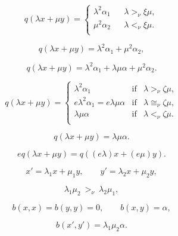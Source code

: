 \documentclass{article}
\begin{document}
\begin{equation}\label{eq:II.7.10}
   q({\lambda} x + \mu y ) = \left\{
    \begin{array}{lll}
      {\lambda}^2 {\alpha}_1 & &  {\lambda} {>_\nu} {\xi} \mu, \\[1mm]
       \mu^2 {\alpha}_2 &  & {\lambda} {<_\nu} {\xi} \mu. \\
    \end{array}
  \right.
  \end{equation}

$$ q({\lambda} x + \mu y) = {\lambda}^2 {\alpha}_1 + \mu^2 {\alpha}_2,$$

$$ q({\lambda} x + \mu y ) = {\lambda}^2 {\alpha}_1 + {\lambda} \mu {\alpha} + \mu^2 {\alpha}_2.$$

\begin{equation}\label{eq:II.7.11}
   q({\lambda} x + \mu y ) = \left\{
    \begin{array}{lll}
      {\lambda}^2 {\alpha}_1 & \text{if} &  {\lambda} {>_\nu} {\zeta} \mu,  \\[1mm]
      e {\lambda}^2 {\alpha}_1  = e {\lambda} \mu  {\alpha} & \text{if}  &  {\lambda} {\cong_\nu} {\zeta} \mu , \\[1mm]
       {\lambda} \mu {\alpha}  & \text{if}  & {\lambda} {<_\nu} {\zeta} \mu . \\
    \end{array}
  \right.
  \end{equation}

\begin{equation} \label{eq:II.7.12} q( {\lambda} x + \mu y )  = {\lambda} \mu {\alpha}.
  \end{equation}

$$ eq({\lambda} x + \mu y) = q ((e{\lambda})x + (e\mu)y).$$

\begin{equation}\label{eq:II.7.13}
x' = {\lambda}_1 x + \mu_1 y, \qquad y' = {\lambda}_2 x + \mu_2 y,
\end{equation}

\begin{equation}\label{eq:II.7.14}
{\lambda}_1 \mu_2  {\ {{>_\nu}} \ } {\lambda}_2 \mu_1,
\end{equation}

\begin{equation}\label{eq:II.7.15}
b(x,x) = b(y,y) = 0, \qquad b(x,y) = {\alpha},
\end{equation}

\begin{equation}\label{eq:II.7.16}
b(x', y') = {\lambda}_1 \mu_2 {\alpha}.
\end{equation}
\end{document}
